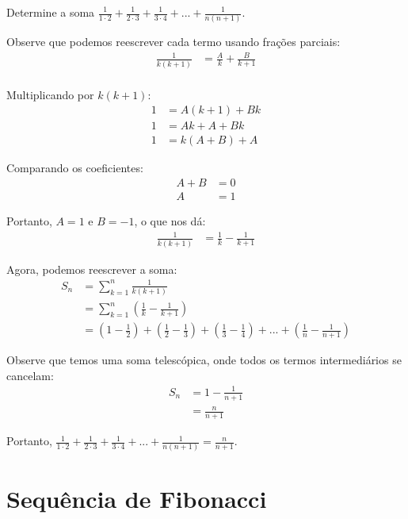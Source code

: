 \documentclass[12pt,a4paper]{article}
\begin{document}
\begin{tcolorbox}[colback=blue!5!white,colframe=blue!75!black,title=Exercício I4]
Determine a soma $\frac{1}{1 \cdot 2} + \frac{1}{2 \cdot 3} + \frac{1}{3 \cdot 4} + ... + \frac{1}{n(n+1)}$.
\end{tcolorbox}

\begin{tcolorbox}[colback=green!5!white,colframe=green!75!black,title=Resolução]
Observe que podemos reescrever cada termo usando frações parciais:
\begin{align}
\frac{1}{k(k+1)} &= \frac{A}{k} + \frac{B}{k+1}\\
\end{align}

Multiplicando por $k(k+1)$:
\begin{align}
1 &= A(k+1) + Bk\\
1 &= Ak + A + Bk\\
1 &= k(A+B) + A
\end{align}

Comparando os coeficientes:
\begin{align}
A + B &= 0\\
A &= 1
\end{align}

Portanto, $A = 1$ e $B = -1$, o que nos dá:
\begin{align}
\frac{1}{k(k+1)} &= \frac{1}{k} - \frac{1}{k+1}
\end{align}

Agora, podemos reescrever a soma:
\begin{align}
S_n &= \sum_{k=1}^{n} \frac{1}{k(k+1)}\\
&= \sum_{k=1}^{n} \left(\frac{1}{k} - \frac{1}{k+1}\right)\\
&= \left(1 - \frac{1}{2}\right) + \left(\frac{1}{2} - \frac{1}{3}\right) + \left(\frac{1}{3} - \frac{1}{4}\right) + ... + \left(\frac{1}{n} - \frac{1}{n+1}\right)
\end{align}

Observe que temos uma soma telescópica, onde todos os termos intermediários se cancelam:
\begin{align}
S_n &= 1 - \frac{1}{n+1}\\
&= \frac{n}{n+1}
\end{align}

Portanto, $\frac{1}{1 \cdot 2} + \frac{1}{2 \cdot 3} + \frac{1}{3 \cdot 4} + ... + \frac{1}{n(n+1)} = \frac{n}{n+1}$.
\end{tcolorbox}

\section{Sequência de Fibonacci}
\end{document}

